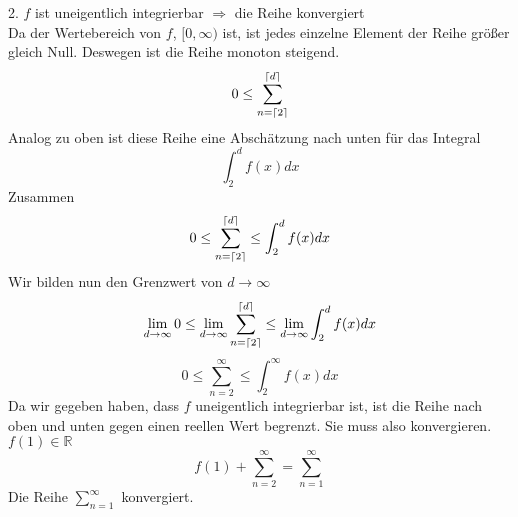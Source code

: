 \documentclass{article}
\DeclarePairedDelimiter\ceil{\lceil}{\rceil}
\begin{document}
\begin{enumerate}[ label = (\alph*) ]
\begin{enumerate}[ label = (\alph*)]
            2. \(f\) ist uneigentlich integrierbar \(\Rightarrow \) die Reihe konvergiert \\
            Da der Wertebereich von \(f\), \([0, \infty)\) ist, ist jedes einzelne Element der Reihe größer gleich Null. Deswegen ist die Reihe monoton steigend.
            \[ 0 \leq \sum_{n=\ceil{2}}^{\ceil{d}} \]
            Analog zu oben ist diese Reihe eine Abschätzung nach unten für das Integral
            \[ \int_2^{d} f(x) dx \]
            Zusammen
            \[0 \leq \sum_{n=\ceil{2}}^{\ceil{d}} \leq \int_2^{d} f(x) dx \]
            Wir bilden nun den Grenzwert von \(d \to \infty \)
            \[ \lim_{d \to \infty} 0 \leq \lim_{d \to \infty} \sum_{n=\ceil{2}}^{\ceil{d}} \leq \lim_{d \to \infty} \int_2^{d} f(x) dx \]
            \[ 0 \leq \sum_{n=2}^{\infty} \leq \int_2^{\infty} f(x) dx \]
            Da wir gegeben haben, dass \(f\) uneigentlich integrierbar ist, ist die Reihe nach oben und unten gegen einen reellen Wert begrenzt.
            Sie muss also konvergieren. \(f(1) \in \mathbb{R}\)
            \[ f(1) + \sum_{n=2}^{\infty} = \sum_{n=1}^{\infty} \]
            Die Reihe \( \sum_{n=1}^{\infty} \) konvergiert.
        \end{enumerate}


\end{enumerate}
\end{document}
